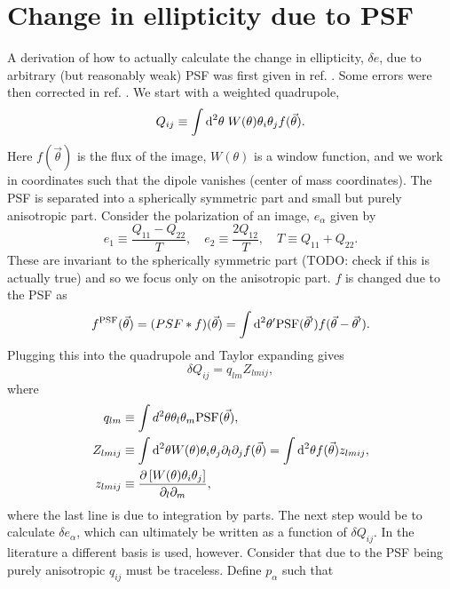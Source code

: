 \documentclass[11pt]{book}
\DeclareRobustCommand{\d}{\ifmmode\text{d}\else d\fi}
\DeclareRobustCommand{\PSF}{\ifmmode\text{PSF}\else d\fi}
\newcommand{\sbr}[1]{\ensuremath{\left[ #1 \right]}}
\begin{document}
\section{Change in ellipticity due to PSF}
A derivation of how to actually calculate the change in ellipticity, $\delta e$, due to arbitrary (but reasonably weak) PSF was first given in ref. \cite{1995ApJ...449..460K}. Some errors were then corrected in ref. \cite{1998ApJ...504..636H}. We start with a weighted quadrupole,
\begin{equation}
	Q_{ij}\equiv\int \d^2\theta\;W(\theta)\theta_i\theta_j f(\vec \theta).
\end{equation}
Here $f(\vec \theta)$ is the flux of the image, $W(\theta)$ is a window function, and we work in coordinates such that the dipole vanishes (center of mass coordinates). The PSF is separated into a spherically symmetric part and small but purely anisotropic part. Consider the polarization of an image, $e_\alpha$ given by
\begin{equation}
	e_1\equiv\frac{Q_{11}-Q_{22}}{T}, \quad e_2\equiv\frac{2Q_{12}}{T}, \quad T\equiv Q_{11}+Q_{22}. \label{eq:e_alpha_def}
\end{equation}
These are invariant to the spherically symmetric part (TODO: check if this is actually true) and so we focus only on the anisotropic part. $f$ is changed due to the PSF as
\begin{equation}
	f^{\PSF}(\vec\theta)=(PSF \ast f)(\vec\theta)=\int\d^2\theta'\PSF(\vec\theta')f(\vec \theta-\vec\theta').
\end{equation}
Plugging this into the quadrupole and Taylor expanding gives
\begin{equation}
	\delta Q_{ij}=q_{lm}Z_{lmij},
\end{equation}
where 
\begin{align}
	q_{lm}&\equiv\int d^2\theta\theta_l\theta_m\PSF(\vec\theta),\\
	Z_{lmij}&\equiv\int\d^2\theta W(\theta)\theta_i\theta_j\partial_l\partial_j f(\vec \theta)=\int \d^2\theta f(\vec \theta)z_{lmij},\\
	z_{lmij}&\equiv\frac{\partial\sbr{W(\theta)\theta_i\theta_j}}{\partial_l\partial_m},
\end{align}
where the last line is due to integration by parts. The next step would be to calculate $\delta e_\alpha$, which can ultimately be written as a function of $\delta Q_{ij}$. In the literature a different basis is used, however. Consider that due to the PSF being purely anisotropic $q_{ij}$ must be traceless. Define $p_\alpha$ such that
\end{document}
